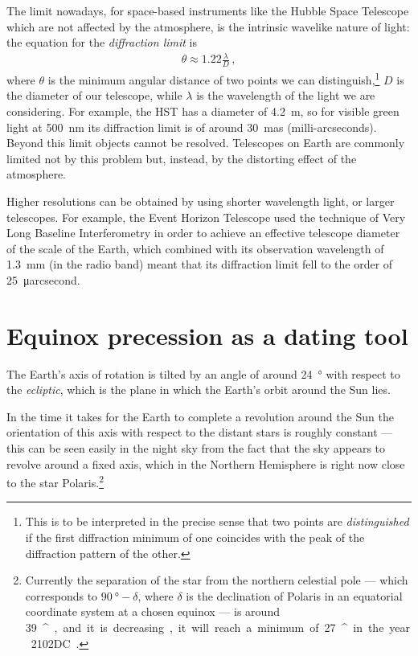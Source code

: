 \documentclass[main.tex]{subfiles}
\begin{document}
The limit nowadays, for space-based instruments like the Hubble Space Telescope which are not affected by the atmosphere, is the intrinsic wavelike nature of light: the equation for the \emph{diffraction limit} is 
%
\begin{align}
\theta \approx \num{1.22} \frac{\lambda }{D}
\,,
\end{align}
%
where \(\theta \) is the minimum angular distance of two points we can distinguish,\footnote{This is to be interpreted in the precise sense that two points are \emph{distinguished} if the first diffraction minimum of one coincides with the peak of the diffraction pattern of the other.} \(D\) is the diameter of our telescope, while \(\lambda \) is the wavelength of the light we are considering.
For example, the HST has a diameter of \SI{4.2}{m}, so for visible green light at \SI{500}{nm} its diffraction limit is of around \SI{30}{mas} (milli-arcseconds).
Beyond this limit objects cannot be resolved. 
Telescopes on Earth are commonly limited not by this problem but, instead, by the distorting effect of the atmosphere. 

Higher resolutions can be obtained by using shorter wavelength light, or larger telescopes. 
For example, the Event Horizon Telescope \cite[]{theeventhorizontelescopecollaborationFirstM87Event2019} used the technique of Very Long Baseline Interferometry in order to achieve an effective telescope diameter of the scale of the Earth, which combined with its observation wavelength of \SI{1.3}{mm} (in the radio band) meant that its diffraction limit fell to the order of \SI{25}{\micro arcsecond}.

\section{Equinox precession as a dating tool}

The Earth's axis of rotation is tilted by an angle of around \SI{24}{\degree} with respect to the \emph{ecliptic}, which is the plane in which the Earth's orbit around the Sun lies. 

In the time it takes for the Earth to complete a revolution around the Sun the orientation of this axis with respect to the distant stars is roughly constant --- this can be seen easily in the night sky from the fact that the sky appears to revolve around a fixed axis, which in the Northern Hemisphere is right now close to the star Polaris.\footnote{Currently the separation of the star from the northern celestial pole --- which corresponds to \(\SI{90}{\degree} - \delta \), where \(\delta \) is the declination of Polaris in an equatorial coordinate system at a chosen equinox --- is around \SI{39}{^\prime}, and it is decreasing, it will reach a minimum of \SI{27}{^\prime} in the year 2102DC \cite[pag.\ 58]{barbieriLezioniDiAstronomia2003}.}
\end{document}
